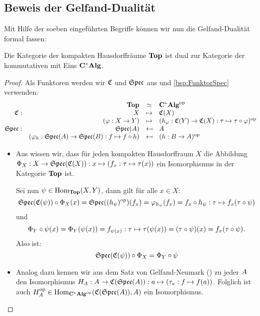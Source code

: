 

\subsection{Beweis der Gelfand-Dualität}

Mit Hilfe der soeben eingeführten Begriffe können wir nun die Gelfand-Dualität formal fassen:

\begin{satz}\label{satz:GD}
Die Kategorie der kompakten Hausdorffräume $\mathbf{Top}$ ist dual zur Kategorie der kommutativen \CAlgn{} mit Eins $\mathbf{C^*Alg}$.
\end{satz}


\begin{proof}Als Funktoren werden wir $\mathfrak{C}$ und $\mathfrak{Spec}$ aus  und \ref{bsp:FunktorSpec} verwenden:
	\[\begin{array}{@{}rrcl@{}}
	 			&\KatTop			&\simeq		&\KatCAlg^\op 												\\
	\stetig: 	&X					&\mapsto	&\stetig(X)													\\
				&(\varphi:X \to Y)	&\mapsto	&(h_\varphi: \stetig(Y) \to \stetig(X): \tau \mapsto \tau \circ \varphi)^\op 		\\
	\SpecC:		&\SpecC(\A)													&\mapsfrom	&\A				\\
				&(\varphi_h: \SpecC(\A) \to \SpecC(\B): f \mapsto f \circ h)	&\mapsfrom	&(h: \B \to \A)^\op
	\end{array}\]

\begin{itemize}
	\item	
Aus  wissen wir, dass für jeden kompakten Hausdorffraum $X$ die Abbildung $\Phi_X: X \to \mathfrak{Spec}(\mathfrak{C}(X)): x \mapsto (f_x: \tau \mapsto \tau(x))$ ein Isomorphismus in der Kategorie $\mathbf{Top}$ ist.

Sei nun $\psi \in \mathrm{Hom}_{\mathbf{Top}}(X,Y)$, dann gilt für alle $x \in X$:
	\[\mathfrak{Spec}(\mathfrak{C}(\psi)) \circ \Phi_X(x) = \mathfrak{Spec}((h_\psi)^{\mathrm{op}})(f_x) = \varphi _{h_\psi}(f_x) = f_x \circ h_\psi: \tau \mapsto f_x(\tau \circ \psi)\]
und
 	\[\Phi_Y \circ \psi(x) = \Phi_Y(\psi(x)) = f_{\psi(x)}: \tau \mapsto \tau(\psi(x)) = (\tau \circ \psi)(x) = f_x(\tau \circ \psi).\]
Also ist: 
	\[\mathfrak{Spec}(\mathfrak{C}(\psi)) \circ \Phi_X = \Phi_Y \circ \psi\]


\item
Analog dazu kennen wir aus dem Satz von Gelfand-Neumark () zu jeder \CAlg{} $A$ den Isomorphismus $H_A: A \to \mathfrak{C}(\mathfrak{Spec}(A)): a \mapsto (\tau_a: f \mapsto f(a))$. Folglich ist auch $H_A^{\mathrm{op}} \in \mathrm{Hom}_{\mathbf{C^*Alg}^{\mathrm{op}}}(\mathfrak{C}(\mathfrak{Spec}(A)),A)$ ein Isomorphismus. 


\end{itemize}
\end{proof}
